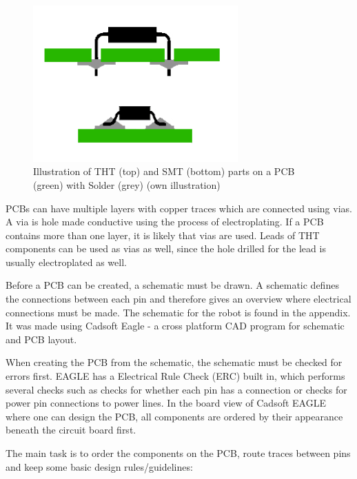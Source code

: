 \documentclass[11pt,a4paper]{article}
\begin{document}
\begin{figure}[H]
  \centering
  \includegraphics[width=0.7\textwidth]{images/part_types_thtsmt.jpg}
  \caption{Illustration of THT (top) and SMT (bottom) parts on a PCB (green) with Solder (grey) (own illustration)}
\end{figure}

PCBs can have multiple layers with copper traces which are connected using vias. A via is hole made conductive using the process of electroplating. If a PCB contains more than one layer, it is likely that vias are used. Leads of THT components can be used as vias as well, since the hole drilled for the lead is usually electroplated as well.

Before a PCB can be created, a schematic must be drawn. A schematic defines the connections between each pin and therefore gives an overview where electrical connections must be made. The schematic for the robot is found in the appendix. It was made using Cadsoft Eagle - a cross platform CAD program for schematic and PCB layout.

When creating the PCB from the schematic, the schematic must be checked for errors first. EAGLE has a Electrical Rule Check (ERC) built in, which performs several checks such as checks for whether each pin has a connection or checks for power pin connections to power lines. In the board view of Cadsoft EAGLE where one can design the PCB, all components are ordered by their appearance beneath the circuit board first.

The main task is to order the components on the PCB, route traces between pins and keep some basic design rules/guidelines:
\end{document}

